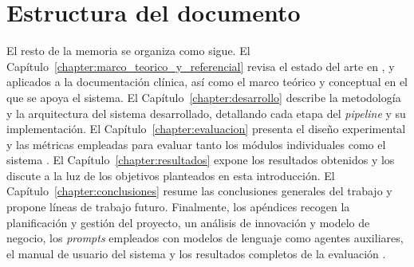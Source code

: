 \section{Estructura del documento}\label{section:estructura_documento}

El resto de la memoria se organiza como sigue. El
Capítulo~\ref{chapter:marco_teorico_y_referencial} revisa el estado del arte en
,  y  aplicados a la documentación clínica, así
como el marco teórico y conceptual en el que se apoya el sistema. El
Capítulo~\ref{chapter:desarrollo} describe la metodología y la arquitectura del sistema desarrollado,
detallando cada etapa del \textit{pipeline} y su implementación. El Capítulo~\ref{chapter:evaluacion}
presenta el diseño experimental y las métricas empleadas para evaluar tanto los módulos individuales
como el sistema . El Capítulo~\ref{chapter:resultados} expone los
resultados obtenidos y los discute a la luz de los objetivos planteados en esta introducción. El
Capítulo~\ref{chapter:conclusiones} resume las conclusiones generales del trabajo y propone líneas de
trabajo futuro. Finalmente, los apéndices recogen la planificación y gestión del proyecto, un análisis
de innovación y modelo de negocio, los \textit{prompts} empleados con modelos de lenguaje como agentes
auxiliares, el manual de usuario del sistema y los resultados completos de la evaluación
.
